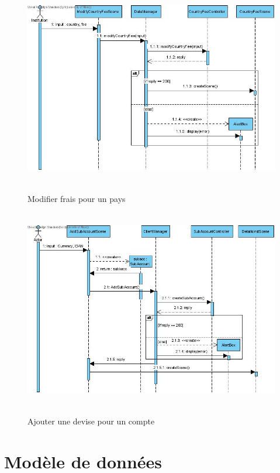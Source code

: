 \documentclass[]{report}
\begin{document}
\newpage

\begin{figure}[h!]
	\hbox{
		\centering\includegraphics[width=\linewidth]{img/Sequence 5 - Extension 2.jpg}
	}
	\caption{Modifier frais pour un pays}
	\end{figure}

\newpage

\begin{figure}[h!]
	\hbox{
		\centering\includegraphics[width=\linewidth]{img/Sequence 6 - Extension 2.jpg}
	}
	\caption{Ajouter une devise pour un compte}
\end{figure}

\newpage

\section{Modèle de données}
\end{document}
